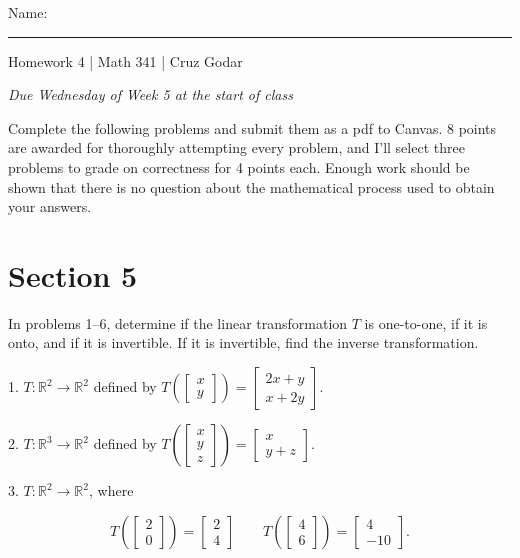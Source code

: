 \documentclass{article}
\begin{document}
\Large Name: \rule{2in}{0.15mm} \hfill Homework 4 | Math 341 | Cruz Godar \vspace{4pt} \normalsize

\textit{Due Wednesday of Week 5 at the start of class}

Complete the following problems and submit them as a pdf to Canvas. 8 points are awarded for thoroughly attempting every problem, and I'll select three problems to grade on correctness for 4 points each. Enough work should be shown that there is no question about the mathematical process used to obtain your answers.

\section{Section 5}

In problems 1--6, determine if the linear transformation $T$ is one-to-one, if it is onto, and if it is invertible. If it is invertible, find the inverse transformation.

1. $T: \mathbb{R}^2 \to \mathbb{R}^2$ defined by $T\left(\left[\begin{array}{c} x \\ y \end{array}\right]\right) = \left[\begin{array}{c} 2x + y \\ x + 2y\end{array}\right]$.

2. $T: \mathbb{R}^3 \to \mathbb{R}^2$ defined by $T\left(\left[\begin{array}{c} x \\ y \\ z \end{array}\right]\right) = \left[\begin{array}{c} x \\ y + z \end{array}\right]$.

3. $T: \mathbb{R}^2 \to \mathbb{R}^2$, where

$$
	T\left(\left[\begin{array}{c} 2 \\ 0 \end{array}\right]\right) = \left[\begin{array}{c} 2 \\ 4 \end{array}\right] \qquad T\left(\left[\begin{array}{c} 4 \\ 6 \end{array}\right]\right) = \left[\begin{array}{c} 4 \\ -10 \end{array}\right].
$$
\end{document}
